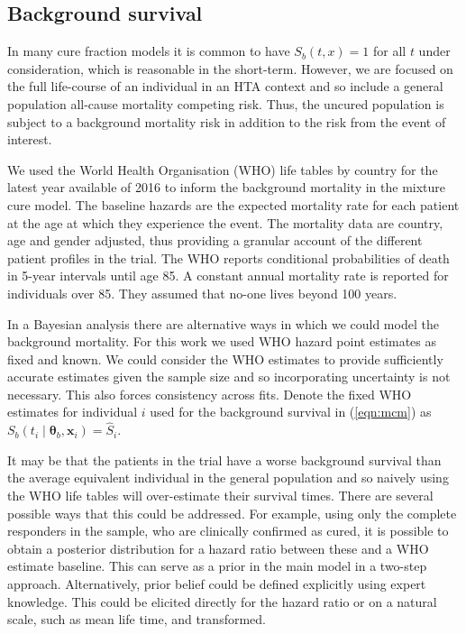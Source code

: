 \documentclass[AMA,STIX1COL]{WileyNJD-v2}
\begin{document}
%
\subsection{Background survival}
In many cure fraction models it is common to have $S_b(t, x) = 1$ for all $t$ under consideration, which is reasonable in the short-term.
However, we are focused on the full life-course of an individual in an HTA context and so include a general population all-cause mortality competing risk.
Thus, the uncured population is subject to a background mortality risk in addition to the risk from the event of interest.

We used the World Health Organisation (WHO) life tables by country for the latest year available of 2016
\cite{wholifetables} to inform the background mortality in the mixture cure model.
The baseline hazards are the expected mortality rate for each patient at the age at which they experience the event.
The mortality data are country, age and gender adjusted, thus providing a granular account of
the different patient profiles in the trial.
The WHO reports conditional probabilities of death in 5-year intervals until age 85.
A constant annual mortality rate is reported for individuals over 85. They assumed that no-one lives beyond 100 years.

In a Bayesian analysis there are alternative ways in which we could model the background mortality.
For this work we used WHO hazard point estimates as fixed and known.
We could consider the WHO estimates to provide sufficiently accurate estimates
given the sample size and so incorporating uncertainty is not necessary. This also forces consistency across fits.
Denote the fixed WHO estimates for individual $i$ used for the background survival in (\ref{eqn:mcm}) as
$S_b(t_i \mid \bm\theta_b, \bm{x}_i) = \hat{S}_i$.

It may be that the patients in the trial have a worse background survival than the average equivalent individual in the general population and so naively using the WHO life tables will over-estimate their survival times.
There are several possible ways that this could be addressed.
For example, using only the complete responders in the sample, who are clinically confirmed as cured, it is possible to obtain a posterior distribution for a hazard ratio between these and a WHO estimate baseline.
This can serve as a prior in the main model in a two-step approach. Alternatively, prior belief could be defined explicitly using expert knowledge.
This could be elicited directly for the hazard ratio or on a natural scale, such as mean life time, and transformed.
\end{document}
